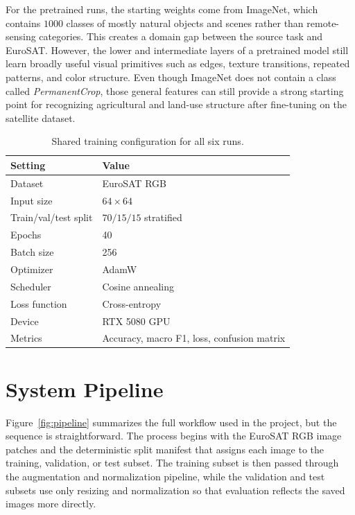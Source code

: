 \documentclass[11pt]{report}
\begin{document}
For the pretrained runs, the starting weights come from ImageNet, which contains \(1000\) classes of mostly natural objects and scenes rather than remote-sensing categories. This creates a domain gap between the source task and EuroSAT. However, the lower and intermediate layers of a pretrained model still learn broadly useful visual primitives such as edges, texture transitions, repeated patterns, and color structure. Even though ImageNet does not contain a class called \textit{PermanentCrop}, those general features can still provide a strong starting point for recognizing agricultural and land-use structure after fine-tuning on the satellite dataset.

\begin{table}[h]
    \centering
    \caption{Shared training configuration for all six runs.}
    \begin{tabular}{ll}
        \toprule
        Setting & Value \\
        \midrule
        Dataset & EuroSAT RGB \\
        Input size & \(64 \times 64\) \\
        Train/val/test split & \(70/15/15\) stratified \\
        Epochs & 40 \\
        Batch size & 256 \\
        Optimizer & AdamW \\
        Scheduler & Cosine annealing \\
        Loss function & Cross-entropy \\
        Device & RTX 5080 GPU \\
        Metrics & Accuracy, macro F1, loss, confusion matrix \\
        \bottomrule
    \end{tabular}
\end{table}

\section{System Pipeline}
Figure~\ref{fig:pipeline} summarizes the full workflow used in the project, but the sequence is straightforward. The process begins with the EuroSAT RGB image patches and the deterministic split manifest that assigns each image to the training, validation, or test subset. The training subset is then passed through the augmentation and normalization pipeline, while the validation and test subsets use only resizing and normalization so that evaluation reflects the saved images more directly.
\end{document}

